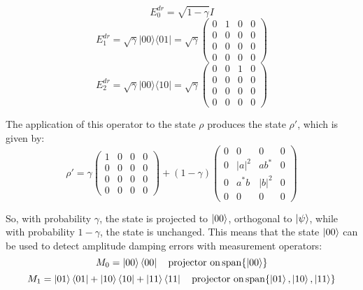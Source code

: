 \documentclass{report}
\begin{document}
\begin{equation}
    E_{0}^{dr} = \sqrt{1-\gamma} I
\end{equation}
\begin{equation}
    E_{1}^{dr} = \sqrt{\gamma}|00\rangle\langle 01| = \sqrt{\gamma}\begin{pmatrix} 0 & 1 & 0 & 0 \\ 0 & 0 & 0 & 0 \\ 0 & 0 & 0 & 0 \\ 0 & 0 & 0 & 0 \end{pmatrix}
\end{equation}
\begin{equation}
    E_{2}^{dr} = \sqrt{\gamma}|00\rangle\langle 10| = \sqrt{\gamma}\begin{pmatrix} 0 & 0 & 1 & 0 \\ 0 & 0 & 0 & 0 \\ 0 & 0 & 0 & 0 \\ 0 & 0 & 0 & 0 \end{pmatrix}
\end{equation}

The application of this operator to the state $\rho$ produces the state $\rho'$, which is given by:
\begin{equation}
    \rho' = \gamma\begin{pmatrix} 1 & 0 & 0 & 0 \\ 0 & 0 & 0 & 0 \\ 0 & 0 & 0 & 0 \\ 0 & 0 & 0 & 0 \end{pmatrix} + (1-\gamma)\begin{pmatrix} 0 & 0 & 0 & 0 \\ 0 & |a|^{2} & a b^{*} & 0 \\ 0 & a^{*} b & |b|^{2} & 0 \\ 0 & 0 & 0 & 0 \end{pmatrix}
\end{equation}

So, with probability $\gamma$, the state is projected to $\ket{00}$, orthogonal to $\ket{\psi}$, while with probability $1-\gamma$, the state is unchanged. This means that the state $\ket{00}$ can be used to detect amplitude damping errors with measurement operators:
\begin{equation}
    M_{0} = \ket{00}\bra{00} \quad \text{projector on} \operatorname{span}\{\ket{00}\}
\end{equation}
\begin{equation}
    M_{1} = \ket{01}\bra{01} + \ket{10}\bra{10} + \ket{11}\bra{11} \quad \text{projector on} \operatorname{span}\{\ket{01}, \ket{10}, \ket{11}\}
\end{equation}
\end{document}
